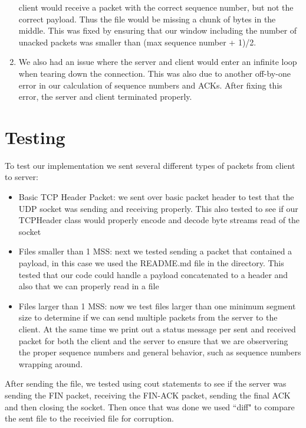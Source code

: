 \documentclass{article}
\begin{document}
\begin{enumerate}
        	client would receive a packet with the correct sequence number, but
        	not the correct payload. Thus the file would be missing a chunk of
        	bytes in the middle. This was fixed by ensuring that our window
        	including the number of unacked packets was smaller than (max
        	sequence number + 1)/2.
        \item We also had an issue where the server and client would enter an
        	infinite loop when tearing down the connection. This was also due
        	to another off-by-one error in our calculation of sequence numbers
        	and ACKs. After fixing this error, the server and client terminated
        	properly.
    \end{enumerate}

\section{Testing}
    To test our implementation we sent several different types of packets from 
    client to server:
    \begin{itemize}
        \item Basic TCP Header Packet: we sent over basic packet header to test
            that the UDP socket was sending and receiving properly.  This also
            tested to see if our TCPHeader class would properly encode and
            decode byte streams read of the socket
        \item Files smaller than 1 MSS: next we tested sending a packet that
            contained a payload, in this case we used the README.md file in the
            directory. This tested that our code could handle a payload
            concatenated to a header and also that we can properly read in a
            file
        \item Files larger than 1 MSS: now we test files larger than one
            minimum segment size to determine if we can send multiple packets
            from the server to the client. At the same time we print out a
            status message per sent and received packet for both the client and
            the server to ensure that we are observering the proper sequence
            numbers and general behavior, such as sequence numbers wrapping
            around.
    \end{itemize}
    After sending the file, we tested using cout statements to see if the
    server was sending the FIN packet, receiving the FIN-ACK packet, sending
    the final ACK and then closing the socket.  Then once that was done we used
    ``diff" to compare the sent file to the receivied file for corruption.
\end{document}
